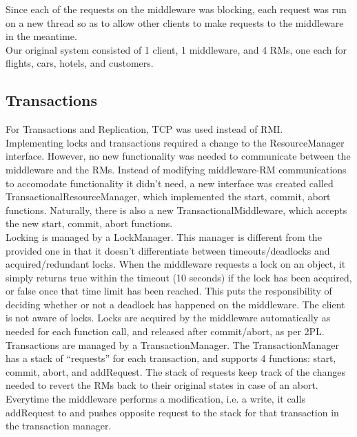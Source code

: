 \documentclass[letterpaper,12pt]{article}
\begin{document}
	Since each of the requests on the middleware was blocking, each request was run on a new thread so as to allow other clients to make requests to the middleware in the meantime.\\

	Our original system consisted of 1 client, 1 middleware, and 4 RMs, one each for flights, cars, hotels, and customers.\\

	\subsection*{Transactions}

	For Transactions and Replication, TCP was used instead of RMI.\\
	
	Implementing locks and transactions required a change to the ResourceManager interface. However, no new functionality was needed to communicate between the middleware and the RMs. Instead of modifying middleware-RM communications to accomodate functionality it didn't need, a new interface was created called TransactionalResourceManager, which implemented the start, commit, abort functions. Naturally, there is also a new TransactionalMiddleware, which accepts the new start, commit, abort functions.\\
	
	Locking is managed by a LockManager. This manager is different from the provided one in that it doesn't differentiate between timeouts/deadlocks and acquired/redundant locks. When the middleware requests a lock on an object, it simply returns true within the timeout (10 seconds) if the lock has been acquired, or false once that time limit has been reached. This puts the responsibility of deciding whether or not a deadlock has happened on the middleware. The client is not aware of locks. Locks are acquired by the middleware automatically as needed for each function call, and released after commit/abort, as per 2PL.\\
	
	Transactions are managed by a TransactionManager. The TransactionManager has a stack of ``requests'' for each transaction, and supports 4 functions: start, commit, abort, and addRequest. The stack of requests keep track of the changes needed to revert the RMs back to their original states in case of an abort. Everytime the middleware performs a modification, i.e. a write, it calls addRequest to and pushes opposite request to the stack for that transaction in the transaction manager. \\
	
\end{document}
